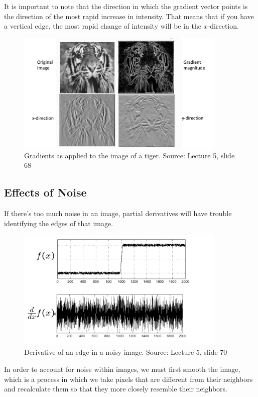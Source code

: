 \documentclass{article}
\begin{document}
It is important to note that the direction in which the gradient vector points is the direction of the most rapid increase in intensity. That means that if you have a vertical edge, the most rapid change of intensity will be in the $x$-direction.

\begin{figure}[H]
\centering
\includegraphics[width=10cm]{lazebnik_tiger.png}
\caption{Gradients as applied to the image of a tiger. Source: Lecture 5, slide 68}
\end{figure}

\subsection{Effects of Noise}

If there's too much noise in an image, partial derivatives will have trouble identifying the edges of that image. \newline

\begin{figure}[H]
\centering
\includegraphics[width=10cm]{seitz_noise.png}
\caption{Derivative of an edge in a noisy image. Source: Lecture 5, slide 70}
\end{figure}

In order to account for noise within images, we must first smooth the image, which is a process in which we take pixels that are different from their neighbors and recalculate them so that they more closely resemble their neighbors. \newline
\end{document}
